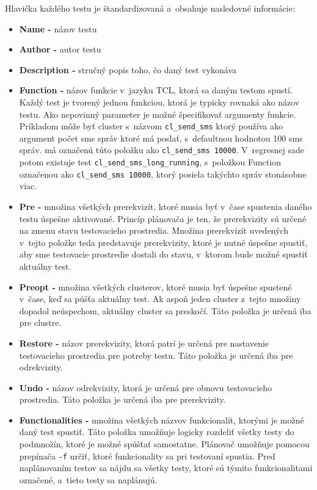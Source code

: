 Hlavička každého testu je štandardizovaná a~obsahuje nasledovné informácie:
\begin{itemize}
\item \textbf{Name -} názov testu
\item \textbf{Author -} autor testu
\item \textbf{Description -} stručný popis toho, čo daný test vykonáva
\item \textbf{Function -} názov funkcie v~jazyku TCL, ktorá sa daným testom spustí. Každý test je tvorený jednou funkciou, ktorá je typicky rovnaká
ako názov testu. Ako nepovinný parameter je možné špecifikovať argumenty funkcie. Príkladom môže byť cluster s~názvom \texttt{cl\_send\_sms} ktorý používa
ako argument počet sms správ ktoré má poslať, s~defaultnou hodnotou 100 sms správ.  
má označenú túto položku ako \texttt{cl\_send\_sms 10000}. V~regresnej sade potom existuje test \texttt{cl\_send\_sms\_long\_running}, 
s~položkou Function označenou ako \texttt{cl\_send\_sms 10000}, ktorý posiela takýchto správ stonásobne viac.
\item \textbf{Pre -} množina všetkých prerekvizít, ktoré musia byť v~čase spustenia daného testu úspešne aktivované. Princíp plánovača je ten,
že prerekvizity sú určené na zmenu stavu testovacieho prostredia. Množina prerekvizít uvedených v~tejto položke teda predstavuje prerekvizity, ktoré
je nutné úspešne spustiť, aby sme testovacie prostredie dostali do stavu, v~ktorom bude možné spustiť aktuálny test.
\item \textbf{Preopt -} množina všetkých clusterov, ktoré musia byť úspešne spustené v~čase, keď sa púšťa aktuálny test. Ak aspoň jeden cluster z~tejto množiny
dopadol neúspechom, aktuálny cluster sa preskočí. Táto položka je určená iba pre clustre.
\item \textbf{Restore -} názov prerekvizity, ktorá patrí je určená pre nastavenie testovacieho prostredia pre potreby testu. Táto položka je určená iba pre odrekvizity.
\item \textbf{Undo -} názov odrekvizity, ktorá je určená pre obnovu testovacieho prostredia. Táto položka je určená iba pre prerekvizity. 
\item \textbf{Functionalities -} množina všetkých názvov funkcionalít, ktorými je možné daný test spustiť. 
Táto položka umožňuje logicky rozdeliť všetky testy do podmnožín, ktoré je možné spúšťať samostatne. 
Plánovač umožňuje pomocou prepínača \texttt{-f} určiť, ktoré funkcionality sa pri testovaní spustia.
Pred naplánovaním testov sa nájdu sa všetky testy, ktoré sú týmito funkcionalitami označené, a~tieto testy sa naplánujú.

\end{itemize}
